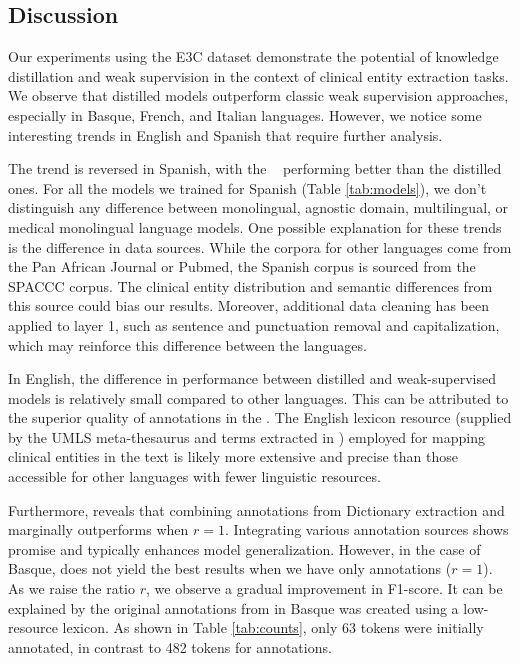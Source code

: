 \subsection{Discussion}

Our experiments using the E3C dataset demonstrate the potential of knowledge distillation and weak supervision in the context of clinical entity extraction tasks. We observe that distilled models outperform classic weak supervision approaches, especially in Basque, French, and Italian languages. However, we notice some interesting trends in English and Spanish that require further analysis.

The trend is reversed in Spanish, with the \weakModel~ performing better than the distilled ones. For all the models we trained for Spanish (Table \ref{tab:models}), we don't distinguish any difference between monolingual, agnostic domain, multilingual, or medical monolingual language models.
One possible explanation for these trends is the difference in data sources. While the corpora for other languages come from the Pan African Journal or Pubmed, the Spanish corpus is sourced from the SPACCC corpus. The clinical entity distribution and semantic differences from this source could bias our results. Moreover, additional data cleaning has been applied to layer 1, such as sentence and punctuation removal and capitalization, which may reinforce this difference between the languages.

In English, the difference in performance between distilled and weak-supervised models is relatively small compared to other languages. This can be attributed to the superior quality of annotations in the \layerTwo. The English lexicon resource (supplied by the UMLS meta-thesaurus and terms extracted in \layerOne) employed for mapping clinical entities in the text is likely more extensive and precise than those accessible for other languages with fewer linguistic resources.

Furthermore, \SettingD reveals that combining annotations from Dictionary extraction and \instruct marginally outperforms when \mbox{$r=1$}. Integrating various annotation sources shows promise and typically enhances model generalization. However, in the case of Basque, \SettingD does not yield the best results when we have only \instruct annotations (\mbox{$r=1$}). As we raise the ratio $r$, we observe a gradual improvement in F1-score. It can be explained by the original annotations from \layerTwo in Basque was created using a low-resource lexicon. As shown in Table \ref{tab:counts}, only 63 \iclin tokens were initially annotated, in contrast to 482 tokens for \instruct annotations.

